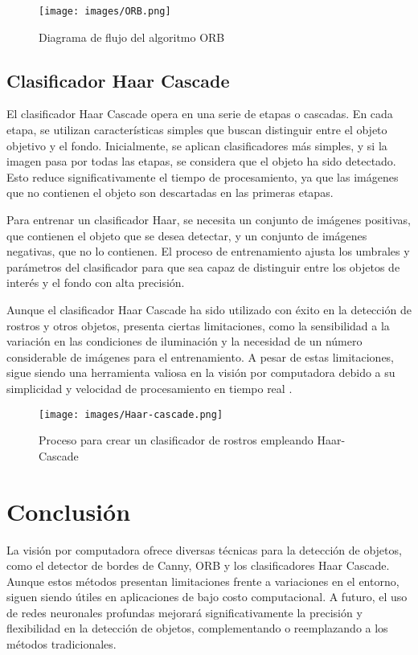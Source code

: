 \documentclass{article}
\begin{document}
\begin{figure}[!ht]
  \centering
  \texttt{[image: images/ORB.png]}
  \caption{Diagrama de flujo del algoritmo ORB}
\end{figure}

\subsection*{Clasificador Haar Cascade}
El clasificador Haar Cascade opera en una serie de etapas o cascadas. En cada etapa, se utilizan características simples que buscan distinguir entre el objeto objetivo y el fondo. Inicialmente, se aplican clasificadores más simples, y si la imagen pasa por todas las etapas, se considera que el objeto ha sido detectado. Esto reduce significativamente el tiempo de procesamiento, ya que las imágenes que no contienen el objeto son descartadas en las primeras etapas.

Para entrenar un clasificador Haar, se necesita un conjunto de imágenes positivas, que contienen el objeto que se desea detectar, y un conjunto de imágenes negativas, que no lo contienen. El proceso de entrenamiento ajusta los umbrales y parámetros del clasificador para que sea capaz de distinguir entre los objetos de interés y el fondo con alta precisión.

Aunque el clasificador Haar Cascade ha sido utilizado con éxito en la detección de rostros y otros objetos, presenta ciertas limitaciones, como la sensibilidad a la variación en las condiciones de iluminación y la necesidad de un número considerable de imágenes para el entrenamiento. A pesar de estas limitaciones, sigue siendo una herramienta valiosa en la visión por computadora debido a su simplicidad y velocidad de procesamiento en tiempo real \cite{omesva_deteccion_rostros_haar}.

\begin{figure}[!ht]
  \centering
  \texttt{[image: images/Haar-cascade.png]}
  \caption{Proceso para crear un clasificador de rostros empleando Haar-Cascade}
\end{figure}

\section*{Conclusión}
La visión por computadora ofrece diversas técnicas para la detección de objetos, como el detector de bordes de Canny, ORB y los clasificadores Haar Cascade. Aunque estos métodos presentan limitaciones frente a variaciones en el entorno, siguen siendo útiles en aplicaciones de bajo costo computacional. A futuro, el uso de redes neuronales profundas mejorará significativamente la precisión y flexibilidad en la detección de objetos, complementando o reemplazando a los métodos tradicionales.



\end{document}
